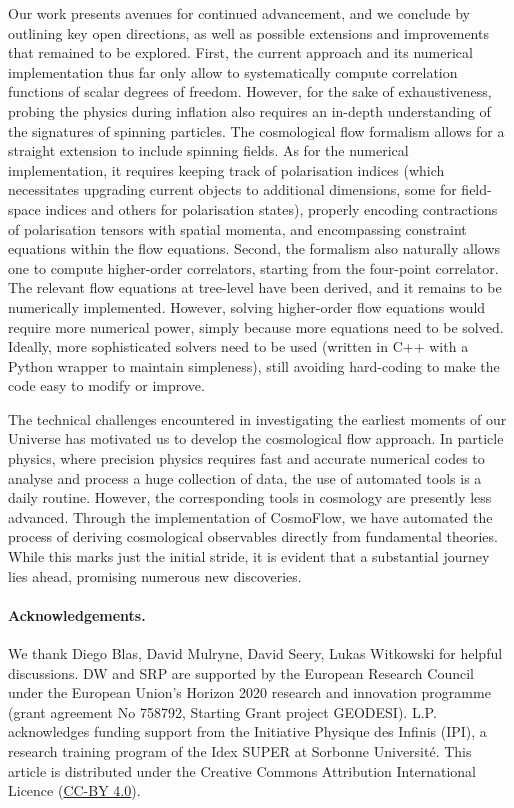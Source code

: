 \documentclass[11pt]{article}
\numberwithin{equation}{section} %
\begin{document}
\vskip 4pt
Our work presents avenues for continued advancement, and we conclude by outlining key open directions, as well as possible extensions and improvements that remained to be explored. First, the current approach and its numerical implementation thus far only allow to systematically compute correlation functions of scalar degrees of freedom. However, for the sake of exhaustiveness, probing the physics during inflation also requires an in-depth understanding of the signatures of spinning particles. The cosmological flow formalism allows for a straight extension to include spinning fields. As for the numerical implementation, it requires keeping track of polarisation indices (which necessitates upgrading current objects to additional dimensions, some for field-space indices and others for polarisation states), properly encoding contractions of polarisation tensors with spatial momenta, and encompassing constraint equations within the flow equations. Second, the formalism also naturally allows one to compute higher-order correlators, starting from the four-point correlator. The relevant flow equations at tree-level have been derived, and it remains to be numerically implemented. However, solving higher-order flow equations would require more numerical power, simply because more equations need to be solved. Ideally, more sophisticated solvers need to be used (written in C++ with a Python wrapper to maintain simpleness), still avoiding hard-coding to make the code easy to modify or improve. 


\vskip 4pt
The technical challenges encountered in investigating the earliest moments of our Universe has motivated us to develop the cosmological flow approach. In particle physics, where precision physics requires fast and accurate numerical codes to analyse and process a huge collection of data, the use of automated tools is a daily routine. However, the corresponding tools in cosmology are presently less advanced. Through the implementation of \textsf{CosmoFlow}, we have automated the process of deriving cosmological observables directly from fundamental theories. While this marks just the initial stride, it is evident that a substantial journey lies ahead, promising numerous new discoveries.



\paragraph{Acknowledgements.} We thank Diego Blas, David Mulryne, David Seery, Lukas Witkowski for helpful discussions. DW and SRP are supported by the European Research Council under the European Union’s Horizon 2020 research and innovation programme (grant agreement No 758792, Starting Grant project GEODESI). L.P. acknowledges funding support from the Initiative Physique des Infinis (IPI), a research training program of the Idex SUPER at Sorbonne Université. This article is distributed under the Creative Commons Attribution International Licence (\href{https://creativecommons.org/licenses/by/4.0/}{CC-BY 4.0}).



\newpage
{}
{}
\small


\end{document}
